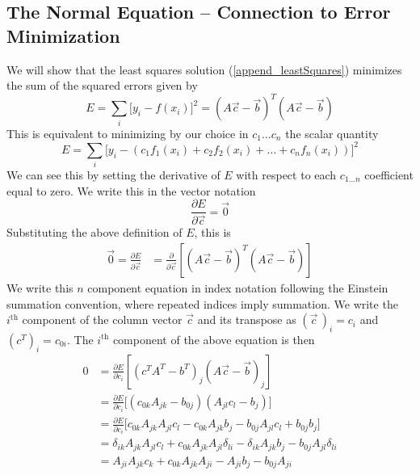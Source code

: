 \subsection{The Normal Equation -- Connection to Error Minimization}

We will show that the least squares solution (\ref{append_leastSquares}) minimizes the sum of the squared errors given by
\begin{equation}
	E = \sum_i \Big[ y_i - f(x_i) \Big]^2 = (A\vec{c} - \vec{b})^T (A\vec{c} - \vec{b})
\end{equation}
This is equivalent to minimizing by our choice in $c_1\ldots c_n$ the scalar quantity
\begin{equation} \label{append_error}
	E = \sum_i \Big[ y_i - \left( c_1 f_1(x_i) + c_2 f_2(x_i) + \ldots + c_n f_n(x_i) \right) \Big]^2
\end{equation}
We can see this by setting the derivative of $E$ with respect to each $c_{1\ldots n}$ coefficient equal to zero. We write this in the vector notation
\begin{equation}
	\frac{\partial E}{\partial \vec{c}} = \vec{0}
\end{equation}
Substituting the above definition of $E$, this is
\begin{align}
	\vec{0} = \frac{\partial E}{\partial \vec{c}} &= \frac{\partial}{\partial \vec{c}} \left[(A\vec{c} - \vec{b})^T (A\vec{c} - \vec{b})\right]
\end{align}
We write this $n$ component equation in index notation following the Einstein summation convention, where repeated indices imply summation. We write the $i^\mathrm{th}$ component of the column vector $\vec{c}$ and its transpose as $\left(\vec{c}\,\right)_i=c_i$ and $\left(c^T\right)_i = c_{0i}$. The $i^\mathrm{th}$ component of the above equation is then
\begin{align}
	0 &= \frac{\partial E}{\partial c_{i}} \left[(c^T A^T - b^T)_{j} (A\vec{c} - \vec{b})_{j}\right] \nonumber\\
	&= \frac{\partial E}{\partial c_{i}} \Big[(c_{0k}A_{jk} - b_{0j}) (A_{jl}c_{l} - b_j)\Big] \nonumber\\
	&= \frac{\partial E}{\partial c_{i}} \Big[ c_{0k}A_{jk}A_{jl}c_l - c_{0k}A_{jk}b_j - b_{0j}A_{jl}c_l + b_{0j}b_j \Big] \nonumber\\
	&= \delta_{ik}A_{jk}A_{jl}c_l + c_{0k}A_{jk}A_{jl}\delta_{li} - \delta_{ik}A_{jk}b_j - b_{0j}A_{jl}\delta_{li} \nonumber\\
	&= A_{ji}A_{jk}c_k + c_{0k}A_{jk}A_{ji} - A_{ji}b_j - b_{0j}A_{ji}
\end{align}
